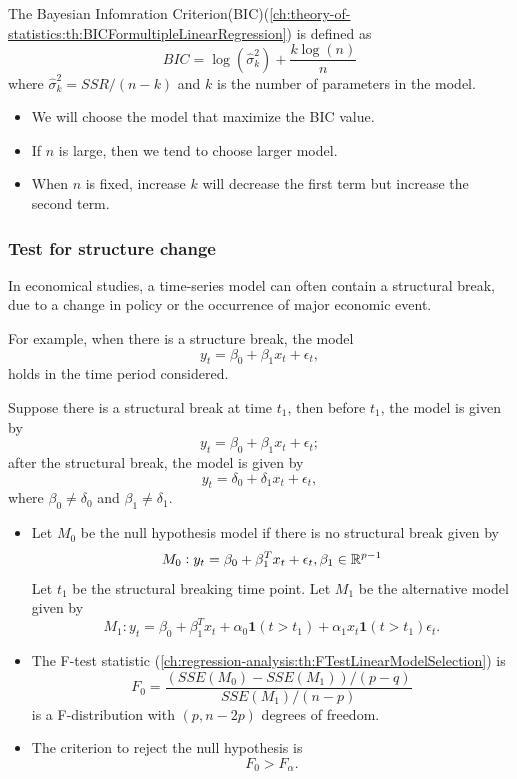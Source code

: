 \begin{refsection}
\begin{definition}
	The Bayesian Infomration Criterion(BIC)(\autoref{ch:theory-of-statistics:th:BICFormultipleLinearRegression}) is defined as
	$$BIC = \log(\hat{\sigma}_k^2) + \frac{k\log(n)}{n}$$
	where $\hat{\sigma}_k^2 = SSR/(n-k)$ and $k$ is the number of parameters in the model.
\end{definition}

\begin{remark}\hfill
	\begin{itemize}
		\item We will choose the model that maximize the BIC value.
		\item If $n$ is large, then we tend to choose larger model.
		\item When $n$ is fixed, increase $k$ will decrease the first term but increase the second term.
	\end{itemize}
\end{remark}


\subsubsection{Test for structure change}

\begin{example}
In economical studies, a time-series model can often contain a structural break, due to a change in policy or the occurrence of major economic event. 

For example, when there is a structure break, the model
$$y_t = \beta_0 + \beta_1 x_t + \epsilon_t,$$
holds in the time period considered. 

Suppose there is a structural break at time $t_1$, then before $t_1$, the model is given by
$$y_t = \beta_0 + \beta_1 x_t + \epsilon_t;$$	
after the structural break, the model is given by
$$y_t = \delta_0 + \delta_1 x_t + \epsilon_t,$$
where $\beta_0\neq \delta_0$ and $\beta_1 \neq \delta_1$. 	
\end{example}


\begin{method}\hfill
\begin{itemize}
	\item Let $M_0$ be the null hypothesis model if there is no structural break given by
	$$M_0: y_t = \beta_0 + \beta_1^T x_t + \epsilon_t, \beta_1\in \mathbb{R}^{p-1} $$
	Let $t_1$ be the structural breaking time point. Let $M_1$ be the alternative model given by
	$$M_1: y_t = \beta_0 + \beta_1^T x_t + \alpha_0 \bm{1}(t>t_1) + \alpha_1 x_t \bm{1}(t>t_1)\epsilon_t. $$
	\item The F-test statistic (\autoref{ch:regression-analysis:th:FTestLinearModelSelection}) is
	$$F_0 = \frac{(SSE(M_0)-SSE(M_1))/(p-q)}{SSE(M_1)/(n-p)}$$
	is a F-distribution with $(p,n-2p)$ degrees of freedom.\\
	\item The criterion to reject the null hypothesis is $$F_0 > F_\alpha.$$
\end{itemize}	
\end{method}



\end{refsection}
